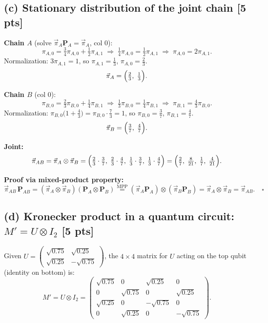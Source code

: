 \documentclass[11pt,a4paper]{article}
\begin{document}
\subsection*{(c) Stationary distribution of the joint chain [5 pts]}

\textbf{Chain $A$} (solve $\vec{\pi}_A\mathbf{P}_A=\vec{\pi}_A$, col $0$):
\[
\pi_{A,0}=\tfrac{3}{4}\pi_{A,0}+\tfrac{1}{2}\pi_{A,1}
\;\Rightarrow\;\tfrac{1}{4}\pi_{A,0}=\tfrac{1}{2}\pi_{A,1}
\;\Rightarrow\;\pi_{A,0}=2\pi_{A,1}.
\]
Normalization: $3\pi_{A,1}=1$, so $\pi_{A,1}=\tfrac{1}{3}$, $\pi_{A,0}=\tfrac{2}{3}$.
\[\vec{\pi}_A=\Bigl(\tfrac{2}{3},\;\tfrac{1}{3}\Bigr).\]

\textbf{Chain $B$} (col $0$):
\[
\pi_{B,0}=\tfrac{2}{3}\pi_{B,0}+\tfrac{1}{4}\pi_{B,1}
\;\Rightarrow\;\tfrac{1}{3}\pi_{B,0}=\tfrac{1}{4}\pi_{B,1}
\;\Rightarrow\;\pi_{B,1}=\tfrac{4}{3}\pi_{B,0}.
\]
Normalization: $\pi_{B,0}\bigl(1+\tfrac{4}{3}\bigr)=\pi_{B,0}\cdot\tfrac{7}{3}=1$,
so $\pi_{B,0}=\tfrac{3}{7}$, $\pi_{B,1}=\tfrac{4}{7}$.
\[\vec{\pi}_B=\Bigl(\tfrac{3}{7},\;\tfrac{4}{7}\Bigr).\]

\textbf{Joint:}
\[
\vec{\pi}_{AB}=\vec{\pi}_A\otimes\vec{\pi}_B
=\Bigl(\tfrac{2}{3}\cdot\tfrac{3}{7},\;\tfrac{2}{3}\cdot\tfrac{4}{7},\;\tfrac{1}{3}\cdot\tfrac{3}{7},\;\tfrac{1}{3}\cdot\tfrac{4}{7}\Bigr)
=\Bigl(\tfrac{2}{7},\;\tfrac{8}{21},\;\tfrac{1}{7},\;\tfrac{4}{21}\Bigr).
\]

\textbf{Proof via mixed-product property:}
\[
\vec{\pi}_{AB}\,\mathbf{P}_{AB}
=(\vec{\pi}_A\otimes\vec{\pi}_B)(\mathbf{P}_A\otimes\mathbf{P}_B)
\overset{\text{MPP}}{=}(\vec{\pi}_A\mathbf{P}_A)\otimes(\vec{\pi}_B\mathbf{P}_B)
=\vec{\pi}_A\otimes\vec{\pi}_B=\vec{\pi}_{AB}.\quad\square
\]

\subsection*{(d) Kronecker product in a quantum circuit: $M'=U\otimes I_2$ [5 pts]}

Given $U=\begin{pmatrix}\sqrt{0.75}&\sqrt{0.25}\\\sqrt{0.25}&-\sqrt{0.75}\end{pmatrix}$,
the $4\times4$ matrix for $U$ acting on the top qubit (identity on bottom) is:
\[
M'=U\otimes I_2=
\begin{pmatrix}
\sqrt{0.75}&0&\sqrt{0.25}&0\\
0&\sqrt{0.75}&0&\sqrt{0.25}\\
\sqrt{0.25}&0&-\sqrt{0.75}&0\\
0&\sqrt{0.25}&0&-\sqrt{0.75}
\end{pmatrix}.
\]
\end{document}
